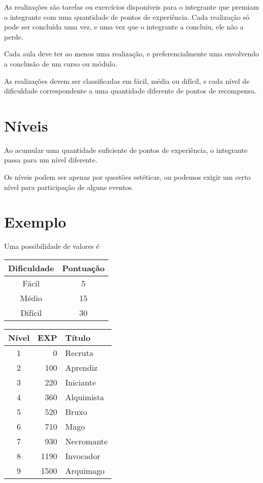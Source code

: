 \documentclass[a4paper,11pt]{report}
\numberwithin{equation}{section}
\begin{document}
As realizações são tarefas ou exercícios disponíveis para
o integrante que premiam o integrante com uma quantidade de pontos
de experiência.
Cada realização só pode ser concluída uma vez, e uma vez
que o integrante a concluiu, ele não a perde.

Cada aula deve ter ao menos uma realização, e preferencialmente
uma envolvendo a conclusão de um curso ou módulo. 

As realizações devem ser classificadas em fácil, média ou
difícil, e cada nível de dificuldade correspondente a uma
quantidade diferente de pontos de recompensa.

\section{ Níveis }

Ao acumular uma quantidade suficiente de pontos de experiência, o 
integrante passa para um nível diferente.

Os níveis podem ser apenas por questões estéticas, ou podemos
exigir um certo nível para participação de alguns eventos.

\section{ Exemplo }

Uma possibilidade de valores é
\begin{center}
  \begin{tabular}{|c|c|} \hline
   {\bf Dificuldade } & {\bf Pontuação} \\ \hline
   Fácil & 5  \\ \hline
   Médio & 15 \\ \hline
   Difícil & 30 \\ \hline
  \end{tabular}
  \vspace{1cm}

  \begin{tabular}{|c|r|l|} \hline
  {\bf Nível} & {\bf EXP} & {\bf Título} \\ \hline
  1 &    0 & Recruta \\ \hline
  2 &  100 & Aprendiz \\ \hline
  3 &  220 & Iniciante \\ \hline
  4 &  360 & Alquimista \\ \hline
  5 &  520 & Bruxo \\ \hline
  6 &  710 & Mago \\ \hline
  7 &  930 & Necromante \\ \hline
  8 & 1190 & Invocador \\ \hline
  9 & 1500 & Arquimago \\ \hline
  \end{tabular}
\end{center}
\end{document}
